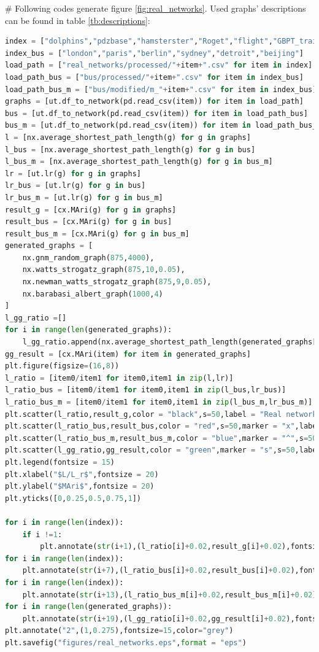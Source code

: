 \documentclass[12pt]{article}
\begin{document}
\noindent
\newline
\# Following codes generate figure \ref{fig:real_networks}. Used graphs' descriptions can be found in table \ref{tb:descriptions}:
\begin{lstlisting}[breaklines=true,language=Python]
index = ["dolphins","pdzbase","hamsterster","Roget","flight","GBPT_train"]
index_bus = ["london","paris","berlin","sydney","detroit","beijing"]
load_path = ["real_networks/processed/"+item+".csv" for item in index]
load_path_bus = ["bus/processed/"+item+".csv" for item in index_bus]
load_path_bus_m = ["bus/modified/m_"+item+".csv" for item in index_bus]
graphs = [ut.df_to_network(pd.read_csv(item)) for item in load_path]
bus = [ut.df_to_network(pd.read_csv(item)) for item in load_path_bus]
bus_m = [ut.df_to_network(pd.read_csv(item)) for item in load_path_bus_m]
l = [nx.average_shortest_path_length(g) for g in graphs]       
l_bus = [nx.average_shortest_path_length(g) for g in bus]
l_bus_m = [nx.average_shortest_path_length(g) for g in bus_m]
lr = [ut.lr(g) for g in graphs]
lr_bus = [ut.lr(g) for g in bus]
lr_bus_m = [ut.lr(g) for g in bus_m]
result_g = [cx.MAri(g) for g in graphs]
result_bus = [cx.MAri(g) for g in bus]
result_bus_m = [cx.MAri(g) for g in bus_m]
generated_graphs = [
    nx.gnm_random_graph(875,4000),
    nx.watts_strogatz_graph(875,10,0.05),
    nx.newman_watts_strogatz_graph(875,9,0.05),
    nx.barabasi_albert_graph(1000,4)
]
l_gg_ratio =[]
for i in range(len(generated_graphs)):
    l_gg_ratio.append(nx.average_shortest_path_length(generated_graphs[i])/ut.lr(generated_graphs[i]))
gg_result = [cx.MAri(item) for item in generated_graphs]
plt.figure(figsize=(16,8))
l_ratio = [item0/item1 for item0,item1 in zip(l,lr)]
l_ratio_bus = [item0/item1 for item0,item1 in zip(l_bus,lr_bus)]
l_ratio_bus_m = [item0/item1 for item0,item1 in zip(l_bus_m,lr_bus_m)]
plt.scatter(l_ratio,result_g,color = "black",s=50,label = "Real networks")
plt.scatter(l_ratio_bus,result_bus,color = "red",s=50,marker = "x",label ="Bus networks")
plt.scatter(l_ratio_bus_m,result_bus_m,color = "blue",marker = "^",s=50,label = "Modified bus networks")
plt.scatter(l_gg_ratio,gg_result,color = "green",marker = "s",s=50,label = "Generated graphs")
plt.legend(fontsize = 15)
plt.xlabel("$L/L_r$",fontsize = 20)
plt.ylabel("$MAri$",fontsize = 20)
plt.yticks([0,0.25,0.5,0.75,1])

for i in range(len(index)):
    if i !=1:
        plt.annotate(str(i+1),(l_ratio[i]+0.02,result_g[i]+0.02),fontsize= 15,color = "grey")
for i in range(len(index)):
    plt.annotate(str(i+7),(l_ratio_bus[i]+0.02,result_bus[i]+0.02),fontsize= 15,color = "grey")
for i in range(len(index)):
    plt.annotate(str(i+13),(l_ratio_bus_m[i]+0.02,result_bus_m[i]+0.02),fontsize= 15,color = "grey")
for i in range(len(generated_graphs)):
    plt.annotate(str(i+19),(l_gg_ratio[i]+0.02,gg_result[i]+0.02),fontsize= 15,color = "grey")
plt.annotate("2",(1,0.275),fontsize=15,color="grey")
plt.savefig("figures/real_networks.eps",format = "eps")
\end{lstlisting}
\end{document}
